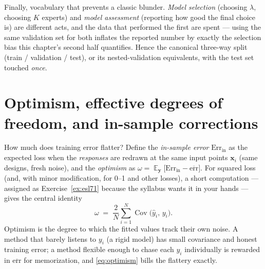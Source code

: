 \documentclass[11pt]{article}
\numberwithin{equation}{section}
\theoremstyle{plain}
\theoremstyle{definition}
\theoremstyle{remark}
\DeclareMathOperator{\E}{\mathbb{E}}
\DeclareMathOperator{\Cov}{Cov}
\newcommand{\x}{\bm{x}}
\newcommand{\y}{\bm{y}}
\newcommand{\Errr}{\mathrm{Err}}
\newcommand{\errbar}{\overline{\mathrm{err}}}
\begin{document}
Finally, vocabulary that prevents a classic blunder. \emph{Model selection} (choosing $\lambda$, choosing $K$ experts) and \emph{model assessment} (reporting how good the final choice is) are different acts, and the data that performed the first are spent --- using the same validation set for both inflates the reported number by exactly the selection bias this chapter's second half quantifies. Hence the canonical three-way split (train / validation / test), or its nested-validation equivalents, with the test set touched \emph{once}.

\section{Optimism, effective degrees of freedom, and in-sample corrections}\label{sec:optimism}

How much does training error flatter? Define the \emph{in-sample error} $\Errr_{\mathrm{in}}$ as the expected loss when the \emph{responses} are redrawn at the same input points $\x_i$ (same designs, fresh noise), and the \emph{optimism} as $\omega = \E_{\y}\big[\Errr_{\mathrm{in}} - \errbar\big]$. For squared loss (and, with minor modification, for 0--1 and other losses), a short computation --- assigned as Exercise~\ref{ex:esl71} because the syllabus wants it in your hands --- gives the central identity
\begin{equation}
\omega \;=\; \frac{2}{N} \sum_{i=1}^N \Cov\big(\hat y_i,\, y_i\big).
\label{eq:optimism}
\end{equation}
Optimism is the degree to which the fitted values track their own noise. A method that barely listens to $y_i$ (a rigid model) has small covariance and honest training error; a method flexible enough to chase each $y_i$ individually is rewarded in $\errbar$ for memorization, and \eqref{eq:optimism} bills the flattery exactly.
\end{document}
